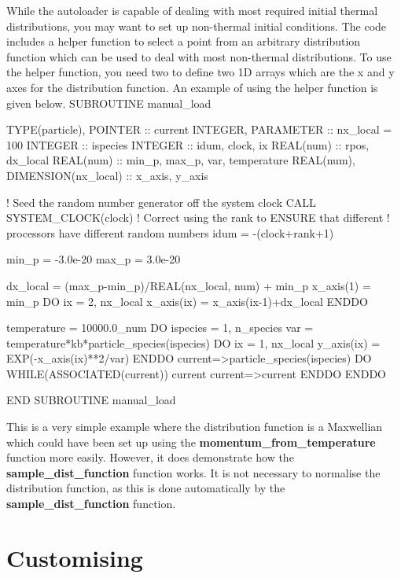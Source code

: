 \documentclass[12pt,a4paper]{article}
\newcommand{\EPOCH}{{\color{warwickdark}\fontfamily{phv}\selectfont{EPOCH}}}
\newenvironment{boxverbatim}{\lboxverbatim{none}}{\endlboxverbatim}
\begin{document}
While the autoloader is capable of dealing with most required initial thermal
distributions, you may want to set up non-thermal initial conditions. The code
includes a helper function to select a point from an arbitrary distribution
function which can be used to deal with most non-thermal distributions. To use
the helper function, you need two to define two 1D arrays which are the x and
y axes for the distribution function. An example of using the helper function
is given below.
\begin{boxverbatim}
SUBROUTINE manual_load

  TYPE(particle), POINTER :: current
  INTEGER, PARAMETER :: nx_local = 100
  INTEGER :: ispecies
  INTEGER :: idum, clock, ix
  REAL(num) :: rpos, dx_local
  REAL(num) :: min_p, max_p, var, temperature
  REAL(num), DIMENSION(nx_local) :: x_axis, y_axis

  ! Seed the random number generator off the system clock
  CALL SYSTEM_CLOCK(clock)
  ! Correct using the rank to ENSURE that different
  ! processors have different random numbers
  idum = -(clock+rank+1)

  min_p = -3.0e-20
  max_p = 3.0e-20

  dx_local = (max_p-min_p)/REAL(nx_local, num) + min_p
  x_axis(1) = min_p
  DO ix = 2, nx_local
    x_axis(ix) = x_axis(ix-1)+dx_local
  ENDDO

  temperature = 10000.0_num
  DO ispecies = 1, n_species
    var = temperature*kb*particle_species(ispecies)%
    DO ix = 1, nx_local
      y_axis(ix) = EXP(-x_axis(ix)**2/var)
    ENDDO
    current=>particle_species(ispecies)%
    DO WHILE(ASSOCIATED(current))
      current%
      current=>current%
    ENDDO
  ENDDO

END SUBROUTINE manual_load
\end{boxverbatim}

This is a very simple example where the distribution function is a Maxwellian
which could have been set up using the {\bf momentum\_from\_temperature}
function more easily. However, it does demonstrate how the
{\bf sample\_dist\_function} function works. It is not necessary to normalise
the distribution function, as this is done automatically by the
{\bf sample\_dist\_function} function.

\section{Customising {\EPOCH}}
\label{sec:customising}
\end{document}
